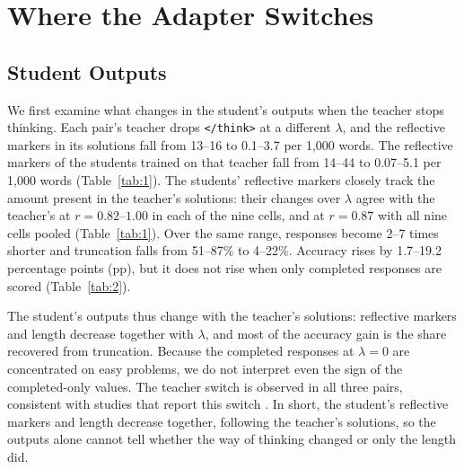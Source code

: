 \section{Where the Adapter Switches}\label{sec:switch}

\subsection{Student Outputs}\label{sec:outputs}

We first examine what changes in the student's outputs when the teacher stops thinking.
Each pair's teacher drops \texttt{</think>} at a different $\lambda$, and the reflective markers in its solutions fall from 13--16 to 0.1--3.7 per 1,000 words.
The reflective markers of the students trained on that teacher fall from 14--44 to 0.07--5.1 per 1,000 words (Table~\ref{tab:1}).
The students' reflective markers closely track the amount present in the teacher's solutions: their changes over $\lambda$ agree with the teacher's at $r = 0.82$--$1.00$ in each of the nine cells, and at $r = 0.87$ with all nine cells pooled (Table~\ref{tab:1}).
Over the same range, responses become 2--7 times shorter and truncation falls from 51--87\% to 4--22\%.
Accuracy rises by 1.7--19.2 percentage points (pp), but it does not rise when only completed responses are scored (Table~\ref{tab:2}).

The student's outputs thus change with the teacher's solutions: reflective markers and length decrease together with $\lambda$, and most of the accuracy gain is the share recovered from truncation.
Because the completed responses at $\lambda=0$ are concentrated on easy problems, we do not interpret even the sign of the completed-only values.
The teacher switch is observed in all three pairs, consistent with studies that report this switch \citep{wu2026interpolation,lan2025spectrum}.
In short, the student's reflective markers and length decrease together, following the teacher's solutions, so the outputs alone cannot tell whether the way of thinking changed or only the length did.

\begin{table}[t]
\centering
\small

\caption{Teacher think rate (share of responses containing \texttt{</think>}) and frequency of reflective markers in the teacher's solutions for each pair, shown alongside the reflective-marker frequency (per 1,000 words) of the students trained on that teacher, across $\lambda$. The students' reflective markers decrease following the frequency in the teacher's solutions. In pair A, the teacher's reflective markers decrease one interval earlier than the tag. Values after $\pm$ are standard deviations across three seeds.}
\label{tab:1}
\end{table}


